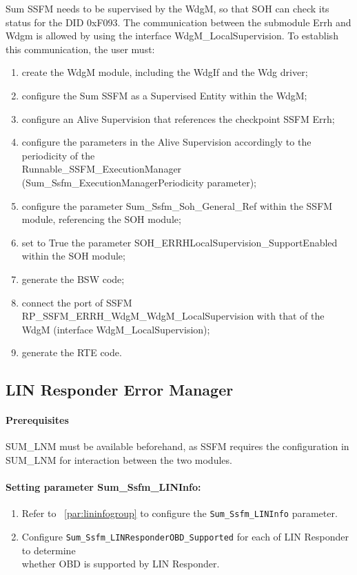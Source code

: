 Sum SSFM needs to be supervised by the WdgM, so that SOH can check its status for the DID 0xF093. The communication between the submodule Errh and Wdgm is allowed by using the interface WdgM\_LocalSupervision.
To establish this communication, the user must:
\begin{enumerate}
    \item create the WdgM module, including the WdgIf and the Wdg driver;
    \item configure the Sum SSFM as a Supervised Entity within the WdgM;
    \item configure an Alive Supervision that references the checkpoint SSFM Errh;
    \item configure the parameters in the Alive Supervision accordingly to the periodicity of the \\ Runnable\_SSFM\_ExecutionManager (Sum\_Ssfm\_ExecutionManagerPeriodicity parameter);
	\item configure the parameter Sum\_Ssfm\_Soh\_General\_Ref within the SSFM module, referencing the SOH module;
	\item set to True the parameter SOH\_ERRHLocalSupervision\_SupportEnabled within the SOH module;
	\item generate the BSW code;
	\item connect the port of SSFM RP\_SSFM\_ERRH\_WdgM\_WdgM\_LocalSupervision with that of the WdgM (interface WdgM\_LocalSupervision);
	\item generate the RTE code.
	
\end{enumerate}

\subsection{LIN Responder Error Manager}
\label{subsec:LINRespErrorManager}

\paragraph{Prerequisites}
SUM\_LNM must be available beforehand, as SSFM requires the configuration in SUM\_LNM for interaction between the two modules.

\paragraph{Setting parameter Sum\_Ssfm\_LINInfo:}
\begin{enumerate}
    \item Refer to ~\ref{par:lininfogroup} to configure the \texttt{Sum\_Ssfm\_LINInfo} parameter.
	\item Configure \texttt{Sum\_Ssfm\_LINResponderOBD\_Supported} for each of LIN Responder to determine \\ whether OBD is supported by LIN Responder.
\end{enumerate}

